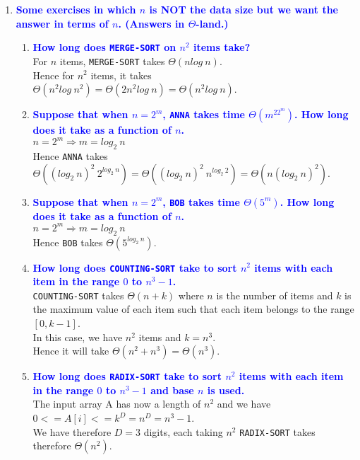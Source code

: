 \documentclass[11pt]{article}
\begin{document}
\begin{enumerate}
\item \textbf{\textcolor{blue}{Some exercises in which $n$ is NOT the data size but we want
the answer in terms of $n$.  (Answers in $\Theta$-land.)}}
    \begin{enumerate}
    \item \textbf{\textcolor{blue}{How long does {\tt MERGE-SORT} on $n^2$ items take?}}
        \\ For $n$ items, {\tt MERGE-SORT} takes $\Theta(n log\ n)$.
        \\ Hence for $n^2$ items, it takes $\Theta(n^2 log\ n^2) = \Theta(2n^2 log\ n) = \Theta(n^2 log\ n)$.
    \item \textbf{\textcolor{blue}{Suppose that when $n=2^m$, {\tt ANNA} takes time $\Theta(m^22^m)$.
    How long does it take as a function of $n$.}}
        \\ $n=2^m \Rightarrow m=log_2\ n$
        \\ Hence {\tt ANNA} takes $\Theta((log_2\ n)^2\ 2^{log_2\ n}) = \Theta((log_2\ n)^2\ n^{log_2\ 2}) = \Theta(n(log_2\ n)^2)$.
    \item \textbf{\textcolor{blue}{Suppose that when $n=2^m$, {\tt BOB} takes time $\Theta(5^m)$.
    How long does it take as a function of $n$.}}
        \\ $n=2^m \Rightarrow m=log_2\ n$
        \\ Hence {\tt BOB} takes $\Theta(5^{log_2\ n})$.
    \item \textbf{\textcolor{blue}{How long does {\tt COUNTING-SORT} take to sort $n^2$ items with
    each item in the range $0$ to $n^3-1$.}}
        \\ {\tt COUNTING-SORT} takes $\Theta(n+k)$ where $n$ is the number of items and $k$ is the maximum value of each item such that each item belongs to the range $[0, k-1]$.
        \\ In this case, we have $n^2$ items and $k = n^3$.
        \\ Hence it will take $\Theta(n^2 + n^3) = \Theta(n^3)$.
    \item \textbf{\textcolor{blue}{How long does {\tt RADIX-SORT} take to sort $n^2$ items with
    each item in the range $0$ to $n^3-1$ and base $n$ is used.}}
        \\ The input array A has now a length of $n^2$ and we have $0 <= A[i] <= k^D = n^D = n^3 - 1$.
        \\ We have therefore $D = 3$ digits, each taking $n^2$ {\tt RADIX-SORT} takes therefore $\Theta(n^2)$.

\end{enumerate}
\end{enumerate}
\end{document}
